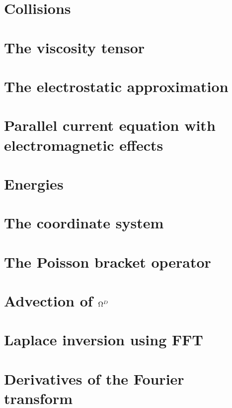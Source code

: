 \documentclass[12pt,a4paper,oneside,openright]{report} %
\begin{document}
\chapter{Collisions}
\label{app:collisions}


\chapter{The viscosity tensor}
\label{app:piTensor}


\chapter{The electrostatic approximation}
\label{app:elstat}


\chapter{Parallel current equation with electromagnetic effects}
\label{app:elMag}


\chapter{Energies}
\label{app:energies}


\chapter{The coordinate system}
\label{app:coord}


\chapter{The Poisson bracket operator}
\label{app:poisson}


\chapter{Advection of \texorpdfstring{$\Omega^D$}{OmegaD}}
\label{app:vortDAdv}


\chapter{Laplace inversion using FFT}
\label{app:lapInv}


\chapter{Derivatives of the Fourier transform}
\label{app:deriv_of_FT}

\end{document}
